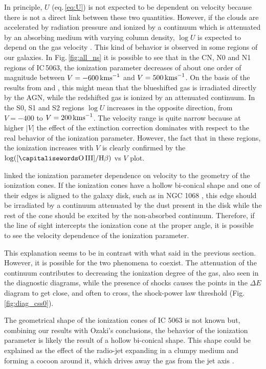 \documentclass[../main.tex]{subfiles}
\begin{document}
In principle, $U$ (eq.\,\ref{eq:U}) is not expected to be dependent on velocity because there is not a direct link between these two quantities.
However, if the clouds are accelerated by radiation pressure and ionized by a continuum which is attenuated by an absorbing medium with varying column density, $\log U$ is expected to depend on the gas velocity \citep{Ozaki09}.
This kind of behavior is observed in some regions of our galaxies.
In Fig.\,\ref{fig:all_ns} it is possible to see that in the CN, N0 and N1 regions of IC\,5063, the ionization parameter decreases of about one order of magnitude between $V=-600\,\si{\kms}$ and $V=500\,\si{\kms}$.
On the basis of the results from \citet{Kraemer00} and \citet{Ozaki09}, this might mean that the blueshifted gas is irradiated directly by the AGN, while the redshifted gas is ionized by an attenuated continuum.
In the S0, S1 and S2 regions $\log U$ increases in the opposite direction, from $V=-400$ to $V=200\,\si{\kms}$.
The velocity range is quite narrow because at higher $\lvert V \rvert$ the effect of the extinction correction dominates with respect to the real behavior of the ionization parameter.
However, the fact that in these regions, the ionization increases with $V$ is clearly confirmed by the $\log([\rm\ion{O}{III}]/\Hb)$ vs $V$ plot.

\citet{Ozaki09} linked  the ionization parameter dependence on velocity to the geometry of the ionization cones.
If the ionization cones have a hollow bi-conical shape and one of their edges is aligned to the galaxy disk, such as in NGC 1068 \citep{Cecil02, Das06}, this edge should be irradiated by a continuum attenuated by the dust present in the disk while the rest of the cone should be excited by the non-absorbed continuum.
Therefore, if the line of sight intercepts the ionization cone at the proper angle, it is possible to see the velocity dependence of the ionization parameter.

This explanation seems to be in contrast with what said in the previous section.
However, it is possible for the two phenomena to coexist. 
The attenuation of the continuum contributes to decreasing the ionization degree of the gas, also seen in the diagnostic diagrams, while the presence of shocks causes the points in the $\Delta E$ diagram to get close, and often to cross, the shock-power law threshold (Fig.\,\ref{fig:diag_css0}).

The geometrical shape of the ionization cones of IC 5063 is not known but, combining our results with Ozaki's conclusions, the behavior of the ionization parameter is likely the result of a hollow bi-conical shape. 
This shape could be explained as the effect of the radio-jet expanding in a clumpy medium and forming a cocoon around it, which drives away the gas from the jet axis \citep{Morganti15,Dasyra15} . 
\end{document}

